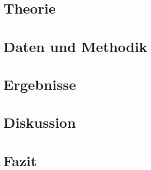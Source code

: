 \documentclass[12pt,ngerman]{scrartcl}
\begin{document}
	\section{Theorie}
\label{sec:theorie}

		


\section{Daten und Methodik}
\label{sec:methodik}

		

	\section{Ergebnisse}
\label{sec:ergebnisse}

		

\section{Diskussion}
\label{sec:diskussion}

		

	\section{Fazit}
	
	
\end{document}
